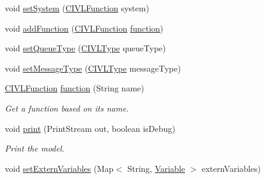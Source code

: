 \begin{DoxyCompactItemize}
\item 
void \hyperlink{classedu_1_1udel_1_1cis_1_1vsl_1_1civl_1_1model_1_1common_1_1CommonModel_ae6928ab833122652a6034be3b79113ee}{set\+System} (\hyperlink{interfaceedu_1_1udel_1_1cis_1_1vsl_1_1civl_1_1model_1_1IF_1_1CIVLFunction}{C\+I\+V\+L\+Function} system)
\item 
void \hyperlink{classedu_1_1udel_1_1cis_1_1vsl_1_1civl_1_1model_1_1common_1_1CommonModel_a7d429214390be66ba23be36caf4fd43f}{add\+Function} (\hyperlink{interfaceedu_1_1udel_1_1cis_1_1vsl_1_1civl_1_1model_1_1IF_1_1CIVLFunction}{C\+I\+V\+L\+Function} \hyperlink{classedu_1_1udel_1_1cis_1_1vsl_1_1civl_1_1model_1_1common_1_1CommonModel_a53c64bc19fa48e4e1c6f038a07d568b4}{function})
\item 
void \hyperlink{classedu_1_1udel_1_1cis_1_1vsl_1_1civl_1_1model_1_1common_1_1CommonModel_a16d44214beb8790951b07a1d66bb12f3}{set\+Queue\+Type} (\hyperlink{interfaceedu_1_1udel_1_1cis_1_1vsl_1_1civl_1_1model_1_1IF_1_1type_1_1CIVLType}{C\+I\+V\+L\+Type} queue\+Type)
\item 
void \hyperlink{classedu_1_1udel_1_1cis_1_1vsl_1_1civl_1_1model_1_1common_1_1CommonModel_a8ea4138bf3fcb686456362e50b839ac7}{set\+Message\+Type} (\hyperlink{interfaceedu_1_1udel_1_1cis_1_1vsl_1_1civl_1_1model_1_1IF_1_1type_1_1CIVLType}{C\+I\+V\+L\+Type} message\+Type)
\item 
\hyperlink{interfaceedu_1_1udel_1_1cis_1_1vsl_1_1civl_1_1model_1_1IF_1_1CIVLFunction}{C\+I\+V\+L\+Function} \hyperlink{classedu_1_1udel_1_1cis_1_1vsl_1_1civl_1_1model_1_1common_1_1CommonModel_a53c64bc19fa48e4e1c6f038a07d568b4}{function} (String name)
\begin{DoxyCompactList}\small\item\em Get a function based on its name. \end{DoxyCompactList}\item 
void \hyperlink{classedu_1_1udel_1_1cis_1_1vsl_1_1civl_1_1model_1_1common_1_1CommonModel_a461cf4b40429f734e50de491cd75851a}{print} (Print\+Stream out, boolean is\+Debug)
\begin{DoxyCompactList}\small\item\em Print the model. \end{DoxyCompactList}\item 
void \hyperlink{classedu_1_1udel_1_1cis_1_1vsl_1_1civl_1_1model_1_1common_1_1CommonModel_a6cb9401279255a04ee21b5d6c0e25774}{set\+Extern\+Variables} (Map$<$ String, \hyperlink{interfaceedu_1_1udel_1_1cis_1_1vsl_1_1civl_1_1model_1_1IF_1_1variable_1_1Variable}{Variable} $>$ extern\+Variables)

\end{DoxyCompactItemize}
